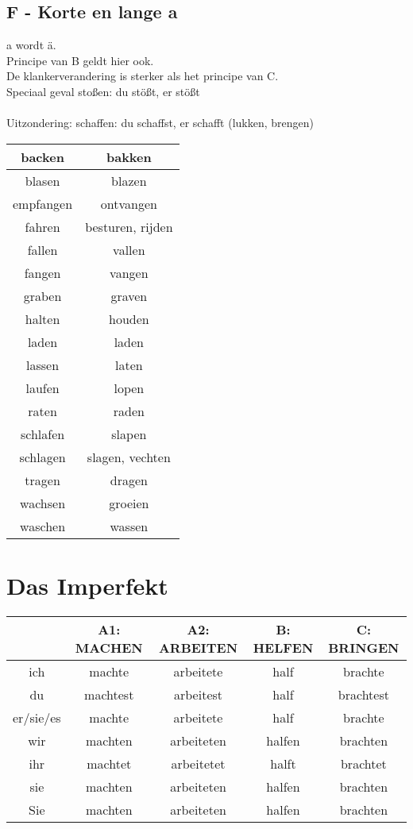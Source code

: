 \documentclass[main.tex]{subfiles}
\begin{document}
\subsection{F - Korte en lange a}
\begin{minipage}{0.5\textwidth}
a wordt ä.\\
Principe van B geldt hier ook.\\
De klankerverandering is sterker als het principe van C.\\
Speciaal geval stoßen: du stößt, er stößt\\
\\
Uitzondering: schaffen: du schaffst, er schafft		(lukken, brengen)
\end{minipage}
\begin{minipage}{0.5\textwidth}
\begin{tabular}{|c|c|}
\hline 
backen & bakken \\ 
\hline 
blasen & blazen \\ 
\hline 
empfangen & ontvangen \\ 
\hline 
fahren & besturen, rijden \\ 
\hline 
fallen & vallen \\ 
\hline 
fangen & vangen \\ 
\hline 
graben & graven \\ 
\hline 
halten & houden \\ 
\hline 
laden & laden \\ 
\hline 
lassen & laten \\ 
\hline 
laufen & lopen \\ 
\hline 
raten & raden \\ 
\hline 
schlafen & slapen \\ 
\hline 
schlagen & slagen, vechten \\ 
\hline 
tragen & dragen \\ 
\hline 
wachsen & groeien \\ 
\hline 
waschen & wassen \\ 
\hline 
\end{tabular} 
\end{minipage}

\section{Das Imperfekt}
\begin{tabular}{|c|c|c|c|c|}
\hline 
\rowcolor{gray}
\setlength\extrarowheight{5pt}
 & A1: MACHEN & A2: ARBEITEN & B: HELFEN & C: BRINGEN \\ 
\hline 
ich & machte & arbeitete & half & brachte \\ 
\hline 
du & machtest & arbeitest & half & brachtest \\ 
\hline 
er/sie/es & machte & arbeitete & half & brachte \\ 
\hline 
wir & machten & arbeiteten & halfen & brachten \\ 
\hline 
ihr & machtet & arbeitetet & halft & brachtet \\ 
\hline 
sie & machten & arbeiteten & halfen & brachten \\ 
\hline 
Sie & machten & arbeiteten & halfen & brachten \\ 
\hline 
\end{tabular} 
\end{document}
